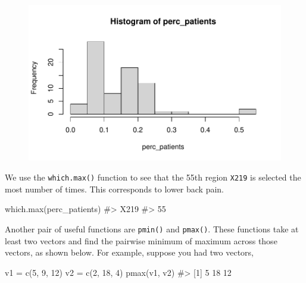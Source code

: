 \documentclass[
  letterpaper,
]{krantz}
\makeatletter
\newenvironment{Shaded}{\begin{snugshade}}{\end{snugshade}}
\newcommand{\CommentTok}[1]{\textcolor[rgb]{0.37,0.37,0.37}{#1}}
\newcommand{\DecValTok}[1]{\textcolor[rgb]{0.68,0.00,0.00}{#1}}
\newcommand{\FunctionTok}[1]{\textcolor[rgb]{0.28,0.35,0.67}{#1}}
\newcommand{\NormalTok}[1]{\textcolor[rgb]{0.00,0.23,0.31}{#1}}
\newcommand{\OtherTok}[1]{\textcolor[rgb]{0.00,0.23,0.31}{#1}}
\newenvironment{kframe}{%
\medskip{}
\setlength{\fboxsep}{.8em}
 \def\at@end@of@kframe{}%
 \ifinner\ifhmode%
  \def\at@end@of@kframe{\end{minipage}}%
  \begin{minipage}{\columnwidth}%
 \fi\fi%
 \def\FrameCommand##1{\hskip\@totalleftmargin \hskip-\fboxsep
 \colorbox{shadecolor}{##1}\hskip-\fboxsep
     \hskip-\linewidth \hskip-\@totalleftmargin \hskip\columnwidth}%
 \MakeFramed {\advance\hsize-\width
   \@totalleftmargin\z@ \linewidth\hsize
   \@setminipage}}%
 {\par\unskip\endMakeFramed%
 \at@end@of@kframe}
\renewenvironment{Shaded}{\begin{kframe}}{\end{kframe}}
\makeatother
\begin{document}
\begin{figure}[H]

{\centering \includegraphics[width=1\textwidth,height=\textheight]{book/3_data_files_files/figure-pdf/unnamed-chunk-21-1.pdf}

}

\end{figure}

We use the \texttt{which.max()} function to see that the 55th region
\texttt{X219} is selected the most number of times. This corresponds to
lower back pain.

\begin{Shaded}
\begin{Highlighting}[]
\FunctionTok{which.max}\NormalTok{(perc\_patients)}
\CommentTok{\#\textgreater{} X219 }
\CommentTok{\#\textgreater{}   55}
\end{Highlighting}
\end{Shaded}

Another pair of useful functions are \texttt{pmin()} and
\texttt{pmax()}. These functions take at least two vectors and find the
pairwise minimum of maximum across those vectors, as shown below. For
example, suppose you had two vectors,

\begin{Shaded}
\begin{Highlighting}[]
\NormalTok{v1 }\OtherTok{=} \FunctionTok{c}\NormalTok{(}\DecValTok{5}\NormalTok{, }\DecValTok{9}\NormalTok{, }\DecValTok{12}\NormalTok{)}
\NormalTok{v2 }\OtherTok{=} \FunctionTok{c}\NormalTok{(}\DecValTok{2}\NormalTok{, }\DecValTok{18}\NormalTok{, }\DecValTok{4}\NormalTok{)}
\FunctionTok{pmax}\NormalTok{(v1, v2)  }
\CommentTok{\#\textgreater{} [1]  5 18 12}
\end{Highlighting}
\end{Shaded}
\end{document}
